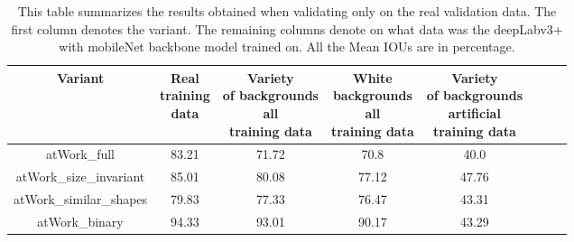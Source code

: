 \begin{table}
	\centering
	\begin{tabular}{|c|c|c|c|c|c|c|c|}
	\hline 
    Variant & \makecell{Real \\training \\data} & \makecell{Variety\\ of backgrounds\\ all \\training data} & \makecell{White \\backgrounds\\ all \\training data} & \makecell{Variety\\ of backgrounds\\ artificial \\training data} \\ 
	\hline 
	atWork\_full & 83.21 & 71.72 & 70.8 & 40.0 \\ 
	\hline 
	atWork\_size\_invariant & 85.01 & 80.08 & 77.12 & 47.76 \\ 
	\hline 
	atWork\_similar\_shapes & 79.83 & 77.33 & 76.47 & 43.31 \\ 
	\hline 
	atWork\_binary & 94.33 & 93.01 & 90.17 & 43.29 \\ 
	\hline 
	\end{tabular}
	\caption{This table summarizes the results obtained when validating only on the real validation data. The first column denotes the variant. The remaining columns denote on what data was the deepLabv3+ with mobileNet backbone model trained on. All the Mean IOUs are in percentage.} 
	\label{Table:realvalmob}
\end{table}

